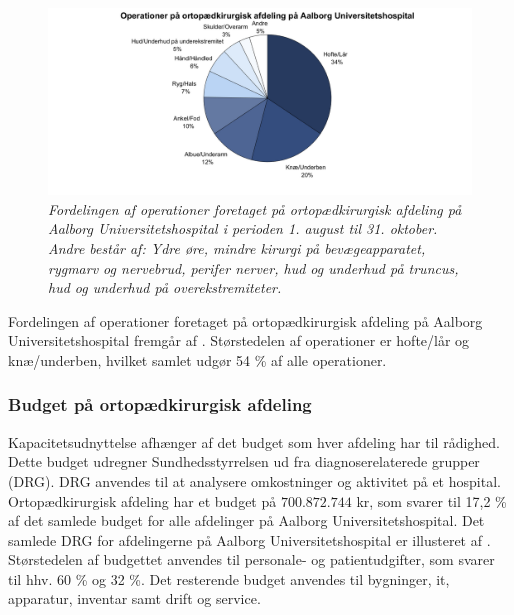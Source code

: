 \begin{figure}[H]
	\flushleft 
	\centering
	\includegraphics[scale=0.45]{figures/operationsdiagram.png}
	\flushleft
	\caption{\textit{Fordelingen af operationer foretaget på ortopædkirurgisk afdeling på Aalborg Universitetshospital i perioden 1. august til 31. oktober. Andre består af: Ydre øre, mindre kirurgi på bevægeapparatet, rygmarv og nervebrud, perifer nerver, hud og underhud på truncus, hud og underhud på overekstremiteter.}}
	\label{operationstype}
\end{figure}

\noindent
Fordelingen af operationer foretaget på ortopædkirurgisk afdeling på Aalborg Universitetshospital fremgår af . Størstedelen af operationer er hofte/lår og knæ/underben, hvilket samlet udgør 54 \% af alle operationer.

\subsubsection{Budget på ortopædkirurgisk afdeling}
Kapacitetsudnyttelse afhænger af det budget som hver afdeling har til rådighed. Dette budget udregner Sundhedsstyrrelsen ud fra diagnoserelaterede grupper (DRG). DRG anvendes til at analysere omkostninger og aktivitet på et hospital.\cite{DRG2016} Ortopædkirurgisk afdeling har et budget på $700.872.744$ kr, som svarer til 17,2 \% af det samlede budget for alle afdelinger på Aalborg Universitetshospital. Det samlede DRG for afdelingerne på Aalborg Universitetshospital er illusteret af .\cite{Rasmussen2016}
Størstedelen af budgettet anvendes til personale- og patientudgifter, som svarer til hhv. 60 \% og 32 \%. Det resterende budget anvendes til bygninger, it, apparatur, inventar samt drift og service\cite{Noegletal2016}. 



